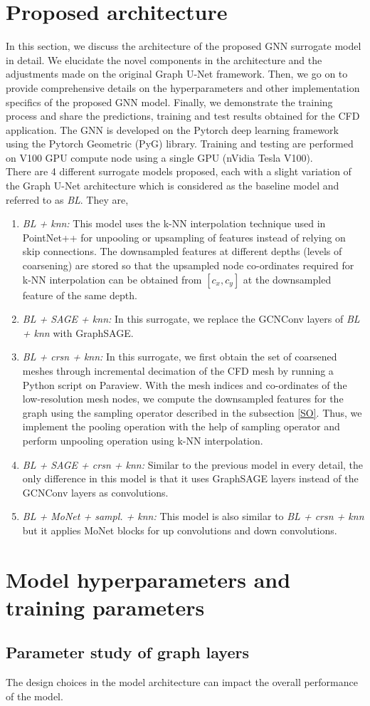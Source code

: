 \section{Proposed architecture}
In this section, we discuss the architecture of the proposed GNN surrogate model in detail. We elucidate the novel components in the architecture and the adjustments made on the original Graph U-Net framework. Then, we go on to provide comprehensive details on the hyperparameters and other implementation specifics of the proposed GNN model. Finally, we demonstrate the training process and share the predictions, training and test results obtained for the CFD application. The GNN is developed on the Pytorch deep learning framework using the Pytorch Geometric (PyG) library. Training and testing are performed on V100 GPU compute node using a single GPU (nVidia Tesla V100).\\
There are 4 different surrogate models proposed, each with a slight variation of the Graph U-Net architecture which is considered as the baseline model and referred to as \textit{BL}. They are, 
\begin{enumerate}
    \item \textit{BL + knn:} This model uses the k-NN interpolation technique used in PointNet++ \cite{pnpp} for unpooling or upsampling of features instead of relying on skip connections. The downsampled features at different depths (levels of coarsening) are stored so that the upsampled node co-ordinates required for k-NN interpolation can be obtained from $[c_{x}, c_{y}]$ at the downsampled feature of the same depth.
    \item \textit{BL + SAGE + knn:} In this surrogate, we replace the GCNConv layers of \textit{BL + knn} with GraphSAGE. 
    \item \textit{BL + crsn + knn:} In this surrogate, we first obtain the set of coarsened meshes through incremental decimation of the CFD mesh by running a Python script on Paraview. With the mesh indices and co-ordinates of the low-resolution mesh nodes, we compute the downsampled features for the graph using the sampling operator described in the subsection \ref{SO}. Thus, we implement the pooling operation with the help of sampling operator and perform unpooling operation using k-NN interpolation. 
    \item \textit{BL + SAGE + crsn + knn:} Similar to the previous model in every detail, the only difference in this model is that it uses GraphSAGE layers instead of the GCNConv layers as convolutions.
    \item \textit{BL + MoNet + sampl. + knn:} This model is also similar to \textit{BL + crsn + knn} but it applies MoNet blocks for up convolutions and down convolutions. 
\end{enumerate}
\section{Model hyperparameters and training parameters}

\subsection{Parameter study of graph layers}
The design choices in the model architecture can impact the overall performance of the model. 

